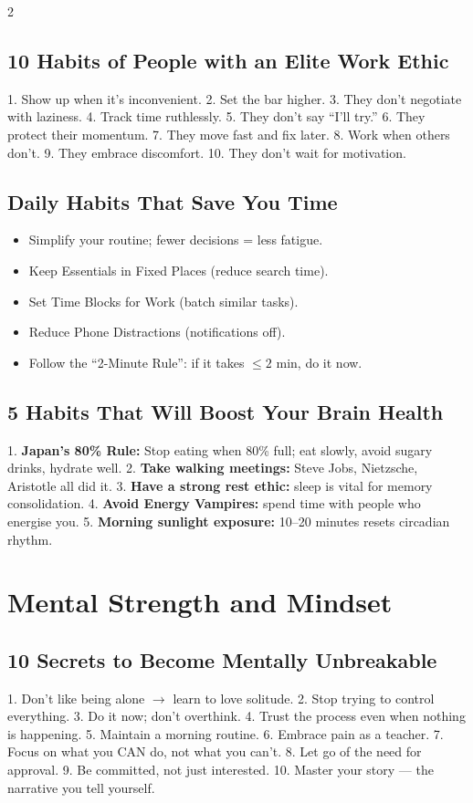 \documentclass[10pt,a4paper]{article}
\begin{document}
\begin{multicols}{2}
\subsection{10 Habits of People with an Elite Work Ethic}
1. Show up when it's inconvenient. 2. Set the bar higher. 3. They don't negotiate with laziness. 4. Track time ruthlessly. 5. They don't say ``I'll try.'' 6. They protect their momentum. 7. They move fast and fix later. 8. Work when others don't. 9. They embrace discomfort. 10. They don't wait for motivation.

\subsection{Daily Habits That Save You Time}
\begin{itemize}
\item Simplify your routine; fewer decisions = less fatigue.
\item Keep Essentials in Fixed Places (reduce search time).
\item Set Time Blocks for Work (batch similar tasks).
\item Reduce Phone Distractions (notifications off).
\item Follow the ``2-Minute Rule'': if it takes $\leq2$ min, do it now.
\end{itemize}

\subsection{5 Habits That Will Boost Your Brain Health}
1. \textbf{Japan's 80\% Rule:} Stop eating when 80\% full; eat slowly, avoid sugary drinks, hydrate well.
2. \textbf{Take walking meetings:} Steve Jobs, Nietzsche, Aristotle all did it.
3. \textbf{Have a strong rest ethic:} sleep is vital for memory consolidation.
4. \textbf{Avoid Energy Vampires:} spend time with people who energise you.
5. \textbf{Morning sunlight exposure:} 10--20 minutes resets circadian rhythm.

\section{Mental Strength and Mindset}

\subsection{10 Secrets to Become Mentally Unbreakable}
1. Don't like being alone $\to$ learn to love solitude.
2. Stop trying to control everything.
3. Do it now; don't overthink.
4. Trust the process even when nothing is happening.
5. Maintain a morning routine.
6. Embrace pain as a teacher.
7. Focus on what you CAN do, not what you can't.
8. Let go of the need for approval.
9. Be committed, not just interested.
10. Master your story --- the narrative you tell yourself.


\end{multicols}
\end{document}
